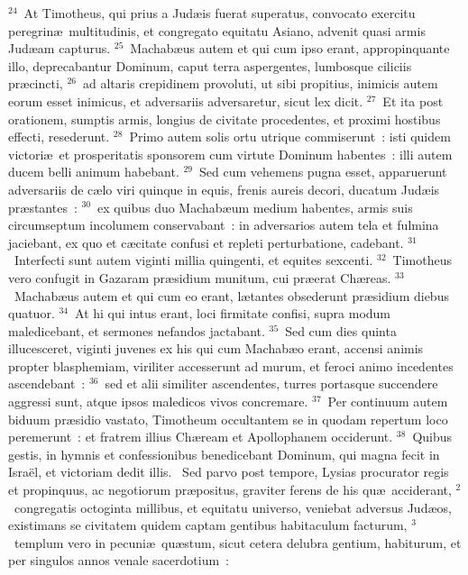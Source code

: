${}^{24}$~At Timotheus, qui prius a Jud\ae is fuerat superatus, convocato exercitu peregrin\ae\ multitudinis, et congregato equitatu Asiano, advenit quasi armis Jud\ae am capturus.
${}^{25}$~Machab\ae us autem et qui cum ipso erant, appropinquante illo, deprecabantur Dominum, caput terra aspergentes, lumbosque ciliciis pr\ae cincti,
${}^{26}$~ad altaris crepidinem provoluti, ut sibi propitius, inimicis autem eorum esset inimicus, et adversariis adversaretur, sicut lex dicit.
${}^{27}$~Et ita post orationem, sumptis armis, longius de civitate procedentes, et proximi hostibus effecti, resederunt.
${}^{28}$~Primo autem solis ortu utrique commiserunt~: isti quidem victori\ae\ et prosperitatis sponsorem cum virtute Dominum habentes~: illi autem ducem belli animum habebant.
${}^{29}$~Sed cum vehemens pugna esset, apparuerunt adversariis de c\ae lo viri quinque in equis, frenis aureis decori, ducatum Jud\ae is pr\ae stantes~:
${}^{30}$~ex quibus duo Machab\ae um medium habentes, armis suis circumseptum incolumem conservabant~: in adversarios autem tela et fulmina jaciebant, ex quo et c\ae citate confusi et repleti perturbatione, cadebant.
${}^{31}$~Interfecti sunt autem viginti millia quingenti, et equites sexcenti.
${}^{32}$~Timotheus vero confugit in Gazaram pr\ae sidium munitum, cui pr\ae erat Ch\ae reas.
${}^{33}$~Machab\ae us autem et qui cum eo erant, l\ae tantes obsederunt pr\ae sidium diebus quatuor.
${}^{34}$~At hi qui intus erant, loci firmitate confisi, supra modum maledicebant, et sermones nefandos jactabant.
${}^{35}$~Sed cum dies quinta illucesceret, viginti juvenes ex his qui cum Machab\ae o erant, accensi animis propter blasphemiam, viriliter accesserunt ad murum, et feroci animo incedentes ascendebant~:
${}^{36}$~sed et alii similiter ascendentes, turres portasque succendere aggressi sunt, atque ipsos maledicos vivos concremare.
${}^{37}$~Per continuum autem biduum pr\ae sidio vastato, Timotheum occultantem se in quodam repertum loco peremerunt~: et fratrem illius Ch\ae ream et Apollophanem occiderunt.
${}^{38}$~Quibus gestis, in hymnis et confessionibus benedicebant Dominum, qui magna fecit in Isra\"el, et victoriam dedit illis.
~Sed parvo post tempore, Lysias procurator regis et propinquus, ac negotiorum pr\ae positus, graviter ferens de his qu\ae\ acciderant,
${}^{2}$~congregatis octoginta millibus, et equitatu universo, veniebat adversus Jud\ae os, existimans se civitatem quidem captam gentibus habitaculum facturum,
${}^{3}$~templum vero in pecuni\ae\ qu\ae stum, sicut cetera delubra gentium, habiturum, et per singulos annos venale sacerdotium~:
